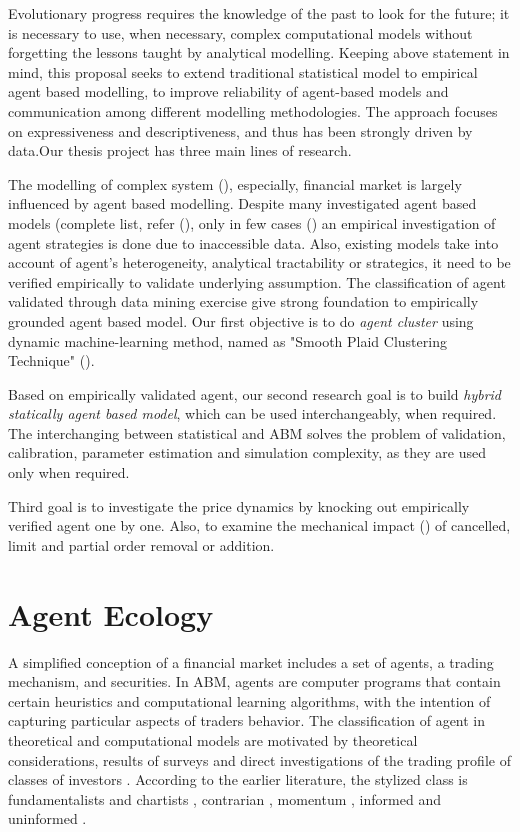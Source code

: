 \documentclass[12pt,a4paper]{article}
\numberwithin{equation}{section}
\numberwithin{figure}{section}
\numberwithin{table}{section}
\begin{document}
Evolutionary progress requires the knowledge of the past to look for the future; it is necessary to use, when necessary, complex computational models without forgetting the lessons taught by analytical modelling. Keeping above statement in mind, this proposal seeks to extend traditional statistical model to empirical agent based modelling, to improve reliability of agent-based models and communication among different modelling methodologies. The approach focuses on expressiveness and descriptiveness, and thus has been strongly driven by data.Our thesis project has three main lines of research. 

The modelling of complex system (\citep{Arthur1994}), especially, financial market is largely influenced by agent based modelling. Despite many investigated agent based models (complete list, refer (\citep{ChakrabortiTokePatriarcaAbergel2011II}), only in few cases (\citep{TumminelloLilloPiiloMantegna2012}) an empirical investigation of agent strategies is done due to inaccessible data. Also, existing models take into account of agent's heterogeneity, analytical tractability or strategics, it need to be verified empirically to validate underlying assumption. The classification of agent validated through data mining exercise give strong foundation to empirically grounded agent based model. Our first objective is to do {\it agent cluster} using dynamic machine-learning method, named as "Smooth Plaid Clustering Technique" (\citep{ShawnMichailidiszKirilenko2011}). 

Based on empirically validated agent, our second research goal is to build {\it hybrid statically agent based model}, which can be used interchangeably, when required. The interchanging between statistical and ABM solves the problem of validation, calibration, parameter estimation and simulation complexity, as they are used only when required.

Third goal is to investigate the price dynamics by knocking out empirically verified agent one by one. Also, to examine the mechanical impact (\cite{FarmerZamani2007}) of cancelled, limit and partial order removal or addition. 

\section{Agent Ecology} \label{section:agent ecology}

A simplified conception of a financial market includes a set of agents, a trading mechanism, and securities. In ABM,  agents are computer programs that contain certain heuristics and computational learning algorithms, with the intention of capturing particular aspects of traders behavior. The classification of agent in theoretical and computational models are motivated by theoretical considerations, results of surveys and direct investigations of the trading profile of classes of investors \citep{TumminelloLilloPiiloMantegna2012}. According to the earlier literature, the stylized class is fundamentalists and chartists \citep{LuxMarchesi1999}, contrarian \citep{chan1988} , momentum \citep{chan1996}, informed and uninformed \citep{grossman1976}.
\end{document}

